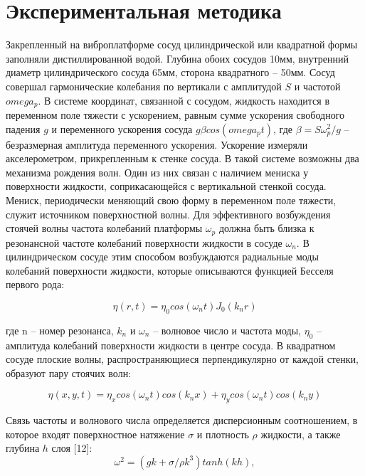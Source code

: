 \section{Экспериментальная методика}\label{sect3_2}
Закрепленный на виброплатформе сосуд цилиндрической или квадратной формы заполняли дистиллированной водой. Глубина обоих сосудов 10мм, внутренний диаметр цилиндрического сосуда 65мм, сторона квадратного – 50мм. Сосуд совершал гармонические колебания по вертикали с амплитудой $S$ и частотой $omega_p$. В системе координат, связанной с сосудом, жидкость находится в переменном поле тяжести с ускорением, равным сумме ускорения свободного падения $g$ и переменного ускорения сосуда $g \beta cos(omega_p t)$, где $\beta = S \omega_p^2/g$ – безразмерная амплитуда переменного ускорения. Ускорение измеряли акселерометром, прикрепленным к стенке сосуда. В такой системе возможны два механизма рождения волн. Один из них связан с наличием мениска у поверхности жидкости, соприкасающейся с вертикальной стенкой сосуда. Мениск, периодически меняющий свою форму в переменном поле тяжести, служит источником поверхностной волны. Для эффективного возбуждения стоячей волны частота колебаний платформы $\omega_p$ должна быть близка к резонансной частоте колебаний поверхности жидкости в сосуде $\omega_n$. В цилиндрическом сосуде этим способом возбуждаются радиальные моды колебаний поверхности жидкости, которые описываются функцией Бесселя первого рода:

\begin{equation}
\eta(r, t) = \eta_0 cos(\omega_n t) J_0(k_n r)
\end{equation}

где n – номер резонанса, $k_n$ и $\omega_n$ – волновое число и частота моды, $\eta_0$ – амплитуда колебаний поверхности жидкости в центре сосуда. В квадратном сосуде плоские волны, распространяющиеся перпендикулярно от каждой стенки, образуют пару стоячих волн:

\begin{equation}
\eta(x, y, t) = \eta_x cos(\omega_n t) cos(k_n x) + \eta_y cos(\omega_n t) cos(k_n y) 
\end{equation}

Связь частоты и волнового числа определяется дисперсионным соотношением, в которое входят поверхностное натяжение $\sigma$ и плотность $\rho$ жидкости, а также глубина $h$ слоя [12]:
\begin{equation}
 \label{eq:disper1}
\omega^2 = (gk + \sigma/\rho k^3)tanh(kh),
\end{equation}

